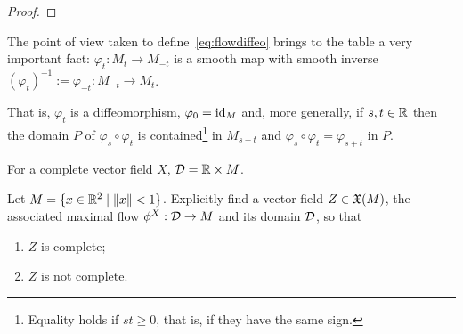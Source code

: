 \begin{proof}

\end{proof}

\begin{remark}\label{rmk:automorphismgroup}
  The point of view taken to define~\eqref{eq:flowdiffeo} brings to the table a very important fact: $\varphi_t : M_t \to M_{-t}$ is a smooth map with smooth inverse $(\varphi_t)^{-1}:=\varphi_{-t}: M_{-t} \to M_t$.

  That is, $\varphi_t$ is a diffeomorphism, $\varphi_0 = \operatorname{id}_M$ and, more generally, if $s,t \in \mathbb{R}$ then the domain $P$ of $\varphi_s \circ \varphi_t$ is contained\footnote{Equality holds if $st \geq 0$, that is, if they have the same sign.} in $M_{s+t}$ and $\varphi_s \circ \varphi_t = \varphi_{s+t}$ in $P$.  
\end{remark}

For a complete vector field $X$, $\mathcal{D} = \mathbb{R}\times M$.

\begin{exercise}
  Let $M = \{x\in\mathbb{R}^2 \mid \|x\|<1\}$. Explicitly find a vector field $Z\in\mathfrak{X}(M)$, the associated maximal flow $\phi^X: \mathcal{D} \to M$ and its domain $\mathcal{D}$, so that
  \begin{enumerate}
    \item $Z$ is complete;
    \item $Z$ is not complete.
  \end{enumerate}
\end{exercise}


